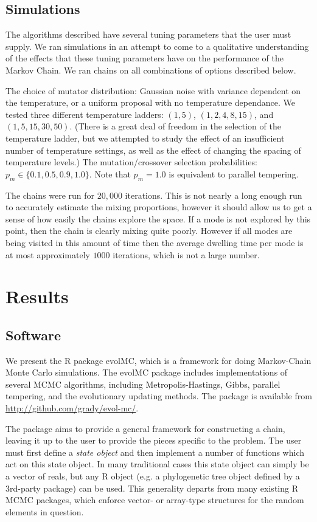 \documentclass[12pt]{article}\usepackage[]{graphicx}\usepackage[]{color}
\begin{document}
\subsection{Simulations}
\label{sec:methods-simulations}
The algorithms described have several tuning parameters that the user
must supply. We ran simulations in an attempt to come to a qualitative
understanding of the effects that these tuning parameters have on the
performance of the Markov Chain. We ran chains on all combinations of
options described below.

The choice of mutator distribution: Gaussian noise with variance
dependent on the temperature, or a uniform proposal with no
temperature dependance.  We tested three different temperature
ladders: $(1,5)$, $(1,2, 4, 8, 15)$, and $(1,5,15,30,50)$. (There is a
great deal of freedom in the selection of the temperature ladder, but
we attempted to study the effect of an insufficient number of
temperature settings, as well as the effect of changing the spacing of
temperature levels.)  The mutation/crossover selection probabilities:
$p_m \in \{0.1, 0.5, 0.9, 1.0\}$. Note that $p_m = 1.0$ is equivalent to
parallel tempering.

The chains were run for $20,000$ iterations. This is not nearly a
long enough run to accurately estimate the mixing proportions, however
it should allow us to get a sense of how easily the chains explore the
space. If a mode is not explored by this point, then the chain is
clearly mixing quite poorly. However if all modes are being visited in
this amount of time then the average dwelling time per mode is at most
approximately $1000$ iterations, which is not a large number.
\section{Results}
\label{sec:results}

\subsection{Software}
\label{sec:software}

We present the R package evolMC, which is a framework for doing
Markov-Chain Monte Carlo simulations. The evolMC package includes
implementations of several MCMC algorithms, including
Metropolis-Hastings, Gibbs, parallel tempering, and the evolutionary
updating methods. The package is available from
\url{http://github.com/grady/evol-mc/}.

The package aims to provide a general framework for constructing a
chain, leaving it up to the user to provide the pieces specific to the
problem. The user must first define a \emph{state object} and then
implement a number of functions which act on this state object. In
many traditional cases this state object can simply be a vector of
reals, but any R object (e.g. a phylogenetic tree object defined by a
3rd-party package) can be used. This generality departs from many
existing R MCMC packages, which enforce vector- or array-type
structures for the random elements in question.
\end{document}
